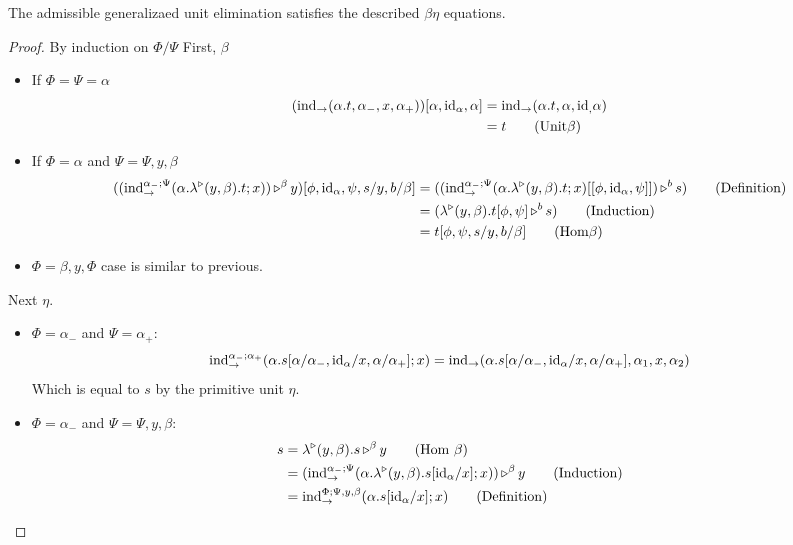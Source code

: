 \documentclass{llncs}
\begin{document}
\begin{lemma}
  The admissible generalizaed unit elimination satisfies the described $\beta\eta$ equations.
\end{lemma}
\begin{proof}
  By induction on $\Phi/\Psi$
  First, $\beta$
  \begin{itemize}
  \item If $\Phi = \Psi = \alpha$
    \begin{align*}
    (\punitelimkontZatABC{\alpha.t}{\alpha_-}{x}{\alpha_+})[\alpha,\punitrefl \alpha, \alpha] &=
    \punitelimkontZatABC{\alpha.t}{\alpha}{\punitrefl}{\alpha}\\
    &= t \tag{Unit$\beta$}
  \end{align*}
  \item If $\Phi = \alpha$ and $\Psi = \Psi, y, \beta$
    \begin{align*}
    (\homrappXtoYatZ
      {(\textrm{ind}_{\to}^{\alpha_-;\Psi}(\alpha.\homrlambdaXatYdotZ y \beta t; x))} y \beta)[\phi,\punitrefl \alpha, \psi, s/y, b/\beta]
      &= (\homrappXtoYatZ
        {(\textrm{ind}_{\to}^{\alpha_-;\Psi}(\alpha.\homrlambdaXatYdotZ y \beta t; x)[[\phi,\punitrefl \alpha, \psi]])} s b)\tag{Definition}\\
      &= (\homrappXtoYatZ {\homrlambdaXatYdotZ y \beta t[\phi,\psi]} s b) \tag{Induction}\\
      &= t[\phi,\psi,s/y,b/\beta]\tag{Hom$\beta$}
    \end{align*}
  \item $\Phi = \beta, y, \Phi$ case is similar to previous.
  \end{itemize}
  
  Next $\eta$.
  \begin{itemize}
  \item $\Phi = \alpha_- $ and $\Psi = \alpha_+$:
    \[ \textrm{ind}_{\to}^{\alpha_-;\alpha_+}(\alpha. s[\alpha/\alpha_-,\punitrefl \alpha/x,\alpha/\alpha_+]; x)
    = \punitelimkontZatABC {\alpha. s[\alpha/\alpha_-,\punitrefl \alpha/x,\alpha/\alpha_+]} {\alpha_1}{x}{\alpha_2}
    \]
    Which is equal to $s$ by the primitive unit $\eta$.
  \item $\Phi = \alpha_-$ and $\Psi = \Psi, y, \beta$:
    \begin{align*}
      s &= \homrappXtoYatZ {\homrlambdaXatYdotZ y \beta s} y \beta\tag{Hom $\beta$}\\
      &= \homrappXtoYatZ {(\textrm{ind}_{\to}^{\alpha_-;\Psi}(\alpha.\homrlambdaXatYdotZ y \beta {s[\punitrefl \alpha/x]}; x))} y \beta \tag{Induction}\\
      &= \textrm{ind}_{\to}^{\Phi;\Psi,y,\beta}(\alpha. s[\punitrefl \alpha/x]; x)\tag{Definition}
    \end{align*}
  \end{itemize}
\end{proof}
\end{document}
